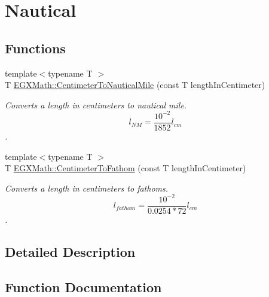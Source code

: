 \hypertarget{group___e_g_x_math-_conversions-_length_conversions-_s_i-_centimeter-_nautical}{}\section{Nautical}
\label{group___e_g_x_math-_conversions-_length_conversions-_s_i-_centimeter-_nautical}
\subsection*{Functions}
\begin{DoxyCompactItemize}
\item 
{\footnotesize template$<$typename T $>$ }\\T \mbox{\hyperlink{group___e_g_x_math-_conversions-_length_conversions-_s_i-_centimeter-_nautical_ga65cf4453e28b375ee5c52389620939c6}{E\+G\+X\+Math\+::\+Centimeter\+To\+Nautical\+Mile}} (const T length\+In\+Centimeter)
\begin{DoxyCompactList}\small\item\em Converts a length in centimeters to nautical mile. \[ l_{NM}= \frac{10^{-2}}{1852} l_{cm} \]. \end{DoxyCompactList}\item 
{\footnotesize template$<$typename T $>$ }\\T \mbox{\hyperlink{group___e_g_x_math-_conversions-_length_conversions-_s_i-_centimeter-_nautical_ga9a46ae39f9cc70947d27a297c1c3f113}{E\+G\+X\+Math\+::\+Centimeter\+To\+Fathom}} (const T length\+In\+Centimeter)
\begin{DoxyCompactList}\small\item\em Converts a length in centimeters to fathoms. \[ l_{fathom}= \frac{10^{-2}}{0.0254 * 72} l_{cm} \]. \end{DoxyCompactList}\end{DoxyCompactItemize}


\subsection{Detailed Description}


\subsection{Function Documentation}
\mbox{\label{group___e_g_x_math-_conversions-_length_conversions-_s_i-_centimeter-_nautical_ga9a46ae39f9cc70947d27a297c1c3f113}} 
